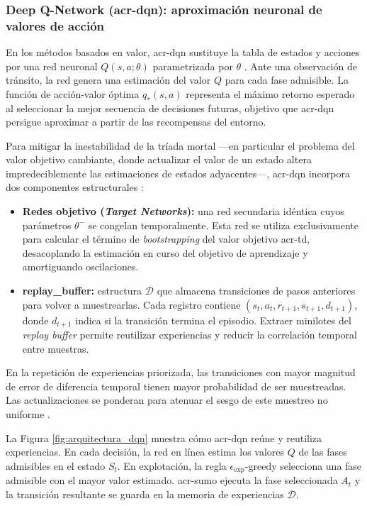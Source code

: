 \subsubsection[Deep Q-Network (DQN)]{Deep Q-Network (\acrshort{acr-dqn}): aproximación neuronal de valores de acción}

En los métodos basados en valor, \acrshort{acr-dqn} sustituye la tabla de estados y acciones por una red neuronal $Q(s, a; \theta)$ parametrizada por $\theta$ \cite{mnih2015}. Ante una observación de tránsito, la red genera una estimación del valor $Q$ para cada fase admisible. La función de acción-valor óptima $q_*(s,a)$ representa el máximo retorno esperado al seleccionar la mejor secuencia de decisiones futuras, objetivo que \acrshort{acr-dqn} persigue aproximar a partir de las recompensas del entorno.

Para mitigar la inestabilidad de la tríada mortal —en particular el problema del valor objetivo cambiante, donde actualizar el valor de un estado altera impredeciblemente las estimaciones de estados adyacentes—, \acrshort{acr-dqn} incorpora dos componentes estructurales \cite{mnih2015}:
\begin{itemize}
    \item \textbf{Redes objetivo (\textit{Target Networks}):} una red secundaria idéntica cuyos parámetros $\theta^-$ se congelan temporalmente. Esta red se utiliza exclusivamente para calcular el término de \textit{bootstrapping} del valor objetivo \acrshort{acr-td}, desacoplando la estimación en curso del objetivo de aprendizaje y amortiguando oscilaciones.
    \item \textbf{\gls{replay_buffer}:} estructura $\mathcal{D}$ que almacena transiciones de pasos anteriores para volver a muestrearlas. Cada registro contiene $(s_t, a_t, r_{t+1}, s_{t+1}, d_{t+1})$, donde $d_{t+1}$ indica si la transición termina el episodio. Extraer minilotes del \textit{replay buffer} permite reutilizar experiencias y reducir la correlación temporal entre muestras.
\end{itemize}

En la repetición de experiencias priorizada, las transiciones con mayor magnitud de error de diferencia temporal tienen mayor probabilidad de ser muestreadas. Las actualizaciones se ponderan para atenuar el sesgo de este muestreo no uniforme \cite{schaul2016prioritized}.

La Figura \ref{fig:arquitectura_dqn} muestra cómo \acrshort{acr-dqn} reúne y reutiliza experiencias. En cada decisión, la red en línea estima los valores $Q$ de las fases admisibles en el estado $S_t$. En explotación, la regla $\epsilon_{\mathrm{exp}}$-greedy selecciona una fase admisible con el mayor valor estimado. \acrshort{acr-sumo} ejecuta la fase seleccionada $A_t$ y la transición resultante se guarda en la memoria de experiencias $\mathcal{D}$.

